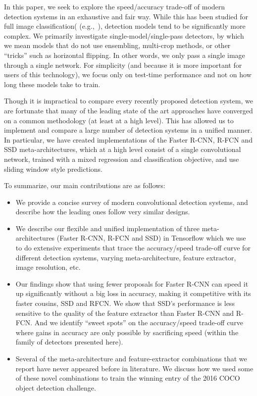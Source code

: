 \documentclass[10pt,twocolumn,letterpaper]{article}
\newcommand{\denselist}{
\itemsep -2pt\topsep-8pt\partopsep-8pt
}
\begin{document}
In this paper, we seek to explore the speed/accuracy trade-off of
modern detection systems in an exhaustive and fair way.  While this has
been studied for full image classification( (e.g.,~\cite{canziani2016analysis}),
detection models tend to be significantly more complex.
We primarily
investigate single-model/single-pass detectors, by which we mean
models that do not use ensembling, multi-crop methods, or other
``tricks'' such as horizontal flipping.  In other words,
we only pass a single image through a single network.
For simplicity (and because it is more important for users of this
technology), we focus only on test-time performance and not on how
long these models take to train.

Though it is impractical to compare every recently proposed detection
system, we are fortunate that many of the
leading state of the art approaches have converged
on a common methodology
(at least at a high level).
This has allowed us to implement and compare a
large number of detection systems in a unified manner.  In particular,
we have created implementations of the Faster R-CNN, R-FCN and SSD
meta-architectures, which at a high level consist of a single
convolutional network,
trained with a mixed regression and classification objective,
and use sliding window style predictions.

To summarize,
our main contributions are as follows:\vspace{-2mm}
\begin{itemize}
\denselist
\item We provide a concise survey of modern convolutional detection systems, and describe
how the leading ones follow very similar designs.  

\item We describe our flexible and unified implementation of three
meta-architectures (Faster R-CNN, R-FCN and SSD) in Tensorflow which we
use to do extensive experiments that trace the accuracy/speed
trade-off curve for different detection systems, varying
meta-architecture, feature extractor, image resolution, etc.

\item Our findings show that using fewer proposals for Faster R-CNN can speed it up significantly without a big loss in accuracy, making it competitive with its faster cousins, SSD and RFCN.  We show that SSD’s performance is less sensitive to the quality of the feature extractor than Faster R-CNN and R-FCN. And we identify “sweet spots” on the accuracy/speed trade-off curve where gains in accuracy are only possible by sacrificing speed (within the family of detectors presented here).

\item Several of the meta-architecture and feature-extractor
combinations that we report have never appeared before in
literature.  We discuss how we used some of these novel combinations
to 
train the winning entry of the 2016 COCO object detection
challenge. 
\end{itemize}
\end{document}
